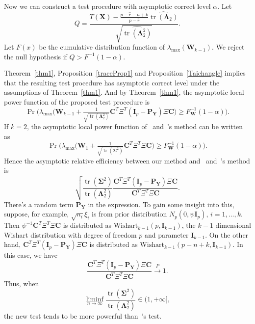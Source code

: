 \documentclass[12pt]{article} %
\DeclareMathOperator{\mytr}{tr}
\newcommand{\bA}{\mathbf{A}}
\newcommand{\bE}{\mathbf{E}}
\newcommand{\bF}{\mathbf{F}}
\newcommand{\bX}{\mathbf{X}}
\newcommand{\bP}{\mathbf{P}}
\newcommand{\bY}{\mathbf{Y}}
\newcommand{\bC}{\mathbf{C}}
\newcommand{\bI}{\mathbf{I}}
\newcommand{\bW}{\mathbf{W}}
\newcommand{\bfsym}[1]{\ensuremath{\boldsymbol{#1}}}
\def\bLambda {\bfsym {\Lambda}}
\def\bSigma {\bfsym {\Sigma}}
\theoremstyle{definition}
\begin{document}
%
Now we can construct a test procedure with asymptotic correct level $\alpha$. Let 
$$
Q=\frac{T(\bX)-\frac{p-\hat{r}-n+k}{p-\hat{r}}\widehat{\mytr(\bLambda_2)}}{\sqrt{\widehat{\mytr(\bLambda_2^2)}}}.
$$
Let $F(x)$ be the cumulative distribution function of $\lambda_{\max}(\bW_{k-1})$.
We reject the null hypothesis if $Q> F^{-1}(1-\alpha)$.

Theorem~\ref{thm1}, Proposition~\ref{traceProp1} and Proposition~\ref{Taichangle} implies that the resulting test procedure has asymptotic correct level under the assumptions of Theorem~\ref{thm1}.
And by Theorem~\ref{thm1}, the asymptotic local power function of the proposed test procedure is
$$
\Pr\Big(
        \lambda_{\max}\big(\bW_{k-1}+\tfrac{1}{\sqrt{\mytr(\bLambda_2^2)}} \bC^T \Xi^T (\bI_p-\bP_{\bY})\Xi \bC\big)\geq F_{\bW}^{-1}(1-\alpha)
\Big).
$$
If $k=2$, the asymptotic local power function of~\cite{Bai1996Efiect} and~\cite{Chen2010A}'s method can be written as
$$
\Pr\Big(
        \lambda_{\max}\big(\bW_{1}+\tfrac{1}{\sqrt{\mytr(\bSigma^2)}} \bC^T \Xi^T \Xi \bC\big)\geq F_{\bW}^{-1}(1-\alpha)
\Big).
$$
Hence the asymptotic relative efficiency between our method and~\cite{Bai1996Efiect} and~\cite{Chen2010A}'s method is
$$
 \sqrt{\frac{{{\mytr(\bSigma^2)}}}{{\mytr(\bLambda_2^2)}}}
\frac{ \bC^T \Xi^T (\bI_p-\bP_{\bY})\Xi \bC}{ {\bC^T \Xi^T \Xi \bC}}.
$$
There's a random term $\bP_{\bY}$ in the expression.
To gain some insight into this,
suppose, for example, $\sqrt{n_i} \xi_i$ is from prior distribution $N_p(0,\psi \bI_p)$, $i=1,\ldots,k$. Then
$
\psi^{-1}\bC^T \Xi^T \Xi \bC$
is distributed as $ \text{Wishart}_{k-1}(p,\bI_{k-1})$, the $k-1$ dimensional Wishart distribution with degree of freedom $p$ and parameter $\bI_{k-1}$.
On the other hand,
$\bC^T \Xi^T (\bI_p-\bP_{\bY})\Xi \bC$  is distributed as $\text{Wishart}_{k-1}(p-n+k,\bI_{k-1})$.
In this case, we have
$$
\frac{\bC^T \Xi^T (\bI_p-\bP_{\bY})\Xi \bC}{\bC^T \Xi^T \Xi \bC}\xrightarrow{P}1.
$$
Thus, when
$$
\liminf_{n\to \infty}\frac{{{\mytr(\bSigma^2)}}}{{\mytr(\bLambda_2^2)}}\in(1,+\infty],
$$
the new test tends to be more powerful than~\cite{Chen2010A}'s test.
\end{document}
